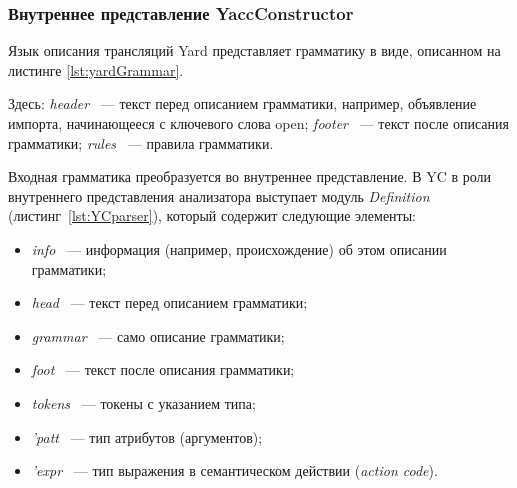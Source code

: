 \documentclass[14pt]{matmex-diploma}
\begin{document}
\subsubsection{Внутреннее представление YaccConstructor}
Язык описания трансляций Yard представляет грамматику в виде, описанном на листинге \ref{lst:yardGrammar}.


Здесь: \textit{header} ~--- текст перед описанием грамматики, например, объявление импорта, начинающееся с ключевого слова open; \textit{footer} ~--- текст после описания грамматики; \textit{rules} ~--- правила грамматики.

Входная грамматика преобразуется во внутреннее представление. В YC в роли внутреннего представления анализатора выступает модуль \textit{Definition} (листинг~\ref{lst:YCparser}), который содержит следующие элементы:
\begin{itemize}
\item
\textit{info} ~--- информация (например, происхождение) об этом описании грамматики;
\item
\textit{head} ~--- текст перед описанием грамматики;
\item
\textit{grammar} ~--- само описание грамматики;
\item
\textit{foot} ~--- текст после описания грамматики;
\item
\textit{tokens} ~--- токены с указанием типа;
\item
\textit{'patt} ~--- тип атрибутов (аргументов);
\item
\textit{'expr} ~--- тип выражения в семантическом действии (\textit{action code}).
\end{itemize}

\end{document}
